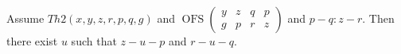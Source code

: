 \documentclass[10pt,a4paper,parskip=half,numbers=endperiod,headings=standardclasses,parskip]{scrbook}
\newcommand{\OFS}[8]{\operatorname{OFS}
\left(\begin{smallmatrix}%
#1 & #2 & #3 & #4 \\
#5 & #6 & #7 & #8
\end{smallmatrix}\right)%
}
\begin{document}
\begin{forthel}
    \begin{lemma} %
      Assume $Th2(x,y,z,r,p,q,g)$ and $\OFS{y}{z}{q}{p}{g}{p}{r}{z}$ and $p-q : z-r$. Then there exist $u$ such that $z-u-p$ and $r-u-q$.
    \end{lemma}

  \end{forthel}

\end{document}
